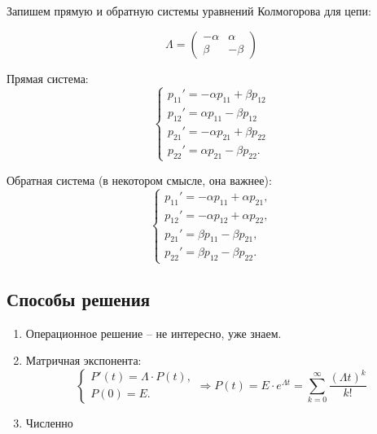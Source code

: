 \begin{ex}
  Запишем прямую и обратную системы уравнений Колмогорова для цепи:
  \begin{figure}[h!]
    \centering
  \end{figure}
  \[
    \Lambda = \begin{pmatrix}
      -\alpha & \alpha \\
      \beta & - \beta
    \end{pmatrix} 
  \]

  Прямая система:
  \[
    \begin{cases}
      p_{11}' = - \alpha p_{11} + \beta p_{12} \\
      p_{12}' = \alpha p_{11} - \beta p_{12} \\
      p_{21}' = -\alpha p_{21} + \beta p_{22} \\
      p_{22}' = \alpha p_{21} - \beta p_{22}.
    \end{cases}
  \]

  Обратная система (в некотором смысле, она важнее):
  \[
    \begin{cases}
      p_{11}' = - \alpha p_{11} + \alpha p_{21}, \\
      p_{12}' = -\alpha p_{12} + \alpha p_{22}, \\
      p_{21}' = \beta p_{11} - \beta p_{21}, \\
      p_{22}' = \beta p_{12} - \beta p_{22}.
    \end{cases}
  \]
\end{ex}

\subsection{Способы решения}

\begin{enumerate}
  \item Операционное решение -- не интересно, уже знаем.
  \item Матричная экспонента:
    \[
      \begin{cases}
        P'(t) = \Lambda \cdot P(t), \\
        P(0) = E.
      \end{cases}
      \Rightarrow
      P(t) = E \cdot e^{\Lambda t} = \sum_{k=0}^\infty \dfrac{(\Lambda t)^k}{k!}
    \]
  \item Численно
\end{enumerate}

